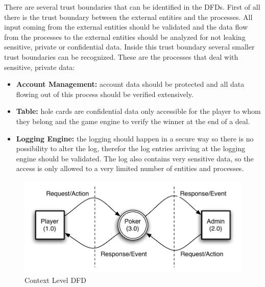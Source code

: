 \documentclass[a4paper,11pt]{report}
\begin{document}
There are several trust boundaries that can be identified in the DFDs. First of all there is the trust boundary between the external entities and the processes. All input coming from the external entities should be validated and the data flow from the processes to the external entities should be analyzed for not leaking sensitive, private or confidential data. Inside this trust boundary several smaller trust boundaries can be recognized. These are the processes that deal with sensitive, private data:
\begin{itemize}
\item \textbf{Account Management:} account data should be protected and all data flowing out of this process should be verified extensively.
\item \textbf{Table:} hole cards are confidential data only accessible for the player to whom they belong and the game engine to verify the winner at the end of a deal.
\item \textbf{Logging Engine:} the logging should happen in a secure way so there is no possibility to alter the log, therefor the log entries arriving at the logging engine should be validated. The log also contains very sensitive data, so the access is only allowed to a very limited number of entities and processes.
\end{itemize}


\begin{figure}[htpb]
  \begin{center}
    \includegraphics[scale=0.8]{context_diagram}
  \end{center}
  \caption{Context Level DFD}\label{fig:context}
\end{figure}
\end{document}

